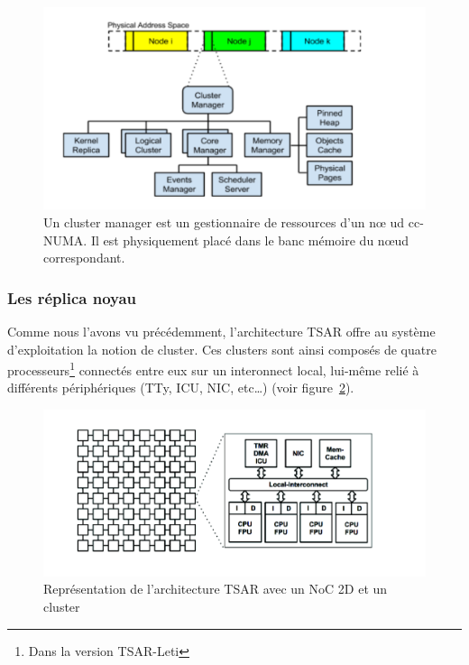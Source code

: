      \begin{figure}[!h]
        \centering \includegraphics[scale=0.16]{include/img/cluster_manager}
        \caption{Un cluster manager est un gestionnaire de ressources d'un n\oe
          ud cc-NUMA. Il est physiquement placé dans le banc mémoire du n\oe ud
          correspondant.}
        \label{fig:cluster_manager}
      \end{figure}

      
    \subsubsection{Les réplica noyau}

      Comme nous l'avons vu précédemment, l'architecture TSAR offre au système
      d'exploitation la notion de cluster. Ces clusters sont ainsi composés de
      quatre processeurs\footnote{Dans la version TSAR-Leti} connectés entre eux
      sur un interonnect local, lui-même relié à différents périphériques (TTy,
      ICU, NIC, etc\ldots) (voir figure~\ref{fig:tsar_cluster}).
      
      \begin{figure}[!h]
        \centering \includegraphics[scale=0.17]{include/img/tsar_clusters.png}
        \caption{Représentation de l'architecture TSAR avec un NoC 2D et un
          cluster~\cite{almaless2014universite}}
        \label{fig:tsar_cluster}

      \end{figure}

